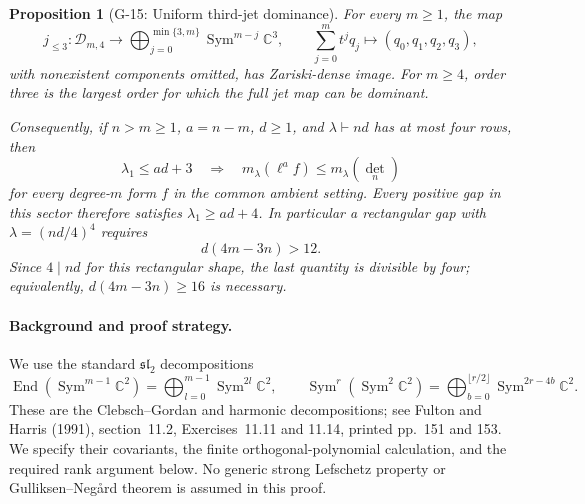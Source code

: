 \documentclass[11pt,a4paper]{article}
\newtheorem{proposition}{Proposition}
\theoremstyle{definition}\newtheorem{definition}{Definition}
\begin{document}
\begin{proposition}[G-15: Uniform third-jet dominance]\label{G-15}
For every $m\geq1$, the map
\[
 j_{\leq3}:\mathcal D_{m,4}\longrightarrow
   \bigoplus_{j=0}^{\min\{3,m\}}
          \operatorname{Sym}^{m-j}\mathbb C^3,
 \qquad \sum_{j=0}^m t^j q_j\longmapsto(q_0,q_1,q_2,q_3),
\]
with nonexistent components omitted, has Zariski-dense image.
For $m\geq4$, order three is the largest order for which the
full jet map can be dominant.

Consequently, if $n>m\geq1$, $a=n-m$, $d\geq1$, and
$\lambda\vdash nd$ has at most four rows, then
\[
 \lambda_1\leq ad+3
 \quad\Longrightarrow\quad
 m_\lambda(\ell^a f)\leq m_\lambda(\det_n)
\]
for every degree-$m$ form $f$ in the common ambient setting.
Every positive gap in this sector therefore satisfies
$\lambda_1\geq ad+4$. In particular a rectangular gap
with $\lambda=(nd/4)^4$ requires
\[
 d(4m-3n)>12.
\]
Since $4\mid nd$ for this rectangular shape, the last
quantity is divisible by four; equivalently,
$d(4m-3n)\geq16$ is necessary.
\end{proposition}

\paragraph{Background and proof strategy.}
We use the standard $\mathfrak{sl}_2$ decompositions
\[
 \operatorname{End}(\operatorname{Sym}^{m-1}\mathbb C^2)
       =\bigoplus_{l=0}^{m-1}\operatorname{Sym}^{2l}\mathbb C^2,
 \qquad
 \operatorname{Sym}^{r}(\operatorname{Sym}^2\mathbb C^2)
       =\bigoplus_{b=0}^{\lfloor r/2\rfloor}
             \operatorname{Sym}^{2r-4b}\mathbb C^2.
\]
These are the Clebsch--Gordan and harmonic decompositions;
see Fulton and Harris (1991), section~11.2, Exercises~11.11
and 11.14, printed pp.~151 and 153. We specify their
covariants, the finite orthogonal-polynomial calculation,
and the required rank argument below. No generic strong
Lefschetz property or Gulliksen--Neg\aa rd theorem is
assumed in this proof.
\end{document}

